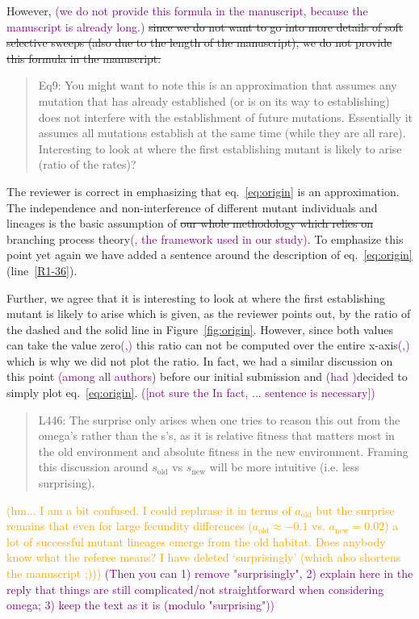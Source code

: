 \documentclass[11pt]{article}
\newenvironment{referee}{\vspace{0.cm} \sffamily \color{colreferee} \begin{quotation} }{\end{quotation} \vspace{0.cm}}
\newcommand{\lmarginpar}[1]{\reversemarginpar\marginpar{\textcolor{colreferee}{\textbf{\textsf{[#1]}}}}}
\newcommand{\addnb}[1]{\refstepcounter{numcom}\lmarginpar{\arabic{numcom}}\label{#1}}
\newcommand{\florence}[1]{\textcolor{purple}{(#1)}}
\newcommand{\pete}[1]{\textcolor{orange}{(#1)}}
\newcounter{numcom}
\begin{document}
However, \florence{we do not provide this formula in the manuscript, because the manuscript is already long.}\st{ since we do not want to go into more details of soft selective sweeps (also due to the length of the manuscript), we do not provide this formula in the manuscript.}

\begin{referee}
Eq9:\addnb{R1_36} You might want to note this is an approximation that assumes any mutation that has already established (or is on its way to establishing) does not interfere with the establishment of future mutations. Essentially it assumes all mutations establish at the same time (while they are all rare). Interesting to look at where the first establishing mutant is likely to arise (ratio of the rates)?
\end{referee}

The reviewer is correct in emphasizing that eq.~\eqref{eq:origin} is an approximation. The independence and non-interference of different mutant individuals and lineages is the basic assumption of \st{our whole methodology which relies on }branching process theory\florence{, the framework used in our study}. To emphasize this point yet again we have added a sentence around the description of eq.~\eqref{eq:origin} (line~\ref{R1-36}). 

Further, we agree that it is interesting to look at where the first establishing mutant is likely to arise which is given, as the reviewer points out, by the ratio of the dashed and the solid line in Figure~\ref{fig:origin}. However, since both values can take the value zero\florence{,} this ratio can not be computed over the entire x-axis\florence{,} which is why we did not plot the ratio. In fact, we had a similar discussion on this point \florence{among all authors} before our initial submission and \florence{had }decided to simply plot eq.~\eqref{eq:origin}. \florence{[not sure the In fact, ... sentence is necessary]}

\begin{referee}
L446:\addnb{R1_37} The surprise only arises when one tries to reason this out from the omega's rather than the s's, as it is relative fitness that matters most in the old environment and absolute fitness in the new environment. Framing this discussion around $s_{\text{old}}$ vs $s_{\text{new}}$ will be more intuitive (i.e. less surprising).
\end{referee}

\pete{hm... I am a bit confused. I could rephrase it in terms of $a_{\text{old}}$ but the surprise remains that even for large fecundity differences ($a_{\text{old}}\approx -0.1$ vs. $a_{\text{new}}=0.02$) a lot of successful mutant lineages emerge from the old habitat. Does anybody know what the referee means? I have deleted `surprisingly' (which also shortens the manuscript ;))} \florence{Then you can 1) remove "surprisingly", 2) explain here in the reply that things are still complicated/not straightforward when considering omega; 3) keep the text as it is (modulo "surprising")}
\end{document}
